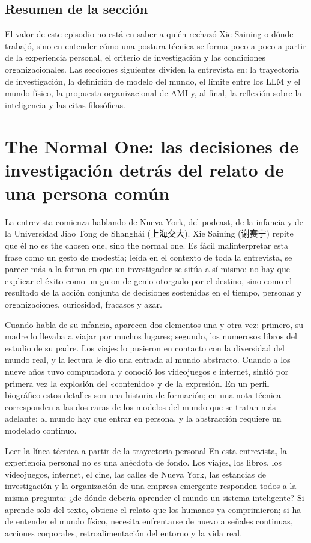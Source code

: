 \documentclass[a4paper]{article}
\begin{document}
\subsection{Resumen de la sección}

El valor de este episodio no está en saber a quién rechazó Xie Saining o dónde trabajó, sino en entender cómo una postura técnica se forma poco a poco a partir de la experiencia personal, el criterio de investigación y las condiciones organizacionales. Las secciones siguientes dividen la entrevista en: la trayectoria de investigación, la definición de modelo del mundo, el límite entre los LLM y el mundo físico, la propuesta organizacional de AMI y, al final, la reflexión sobre la inteligencia y las citas filosóficas.

\section{The Normal One: las decisiones de investigación detrás del relato de una persona común}

La entrevista comienza hablando de Nueva York, del podcast, de la infancia y de la Universidad Jiao Tong de Shanghái (上海交大). Xie Saining (谢赛宁) repite que él no es the chosen one, sino the normal one. Es fácil malinterpretar esta frase como un gesto de modestia; leída en el contexto de toda la entrevista, se parece más a la forma en que un investigador se sitúa a sí mismo: no hay que explicar el éxito como un guion de genio otorgado por el destino, sino como el resultado de la acción conjunta de decisiones sostenidas en el tiempo, personas y organizaciones, curiosidad, fracasos y azar.

Cuando habla de su infancia, aparecen dos elementos una y otra vez: primero, su madre lo llevaba a viajar por muchos lugares; segundo, los numerosos libros del estudio de su padre. Los viajes lo pusieron en contacto con la diversidad del mundo real, y la lectura le dio una entrada al mundo abstracto. Cuando a los nueve años tuvo computadora y conoció los videojuegos e internet, sintió por primera vez la explosión del «contenido» y de la expresión. En un perfil biográfico estos detalles son una historia de formación; en una nota técnica corresponden a las dos caras de los modelos del mundo que se tratan más adelante: al mundo hay que entrar en persona, y la abstracción requiere un modelado continuo.

\begin{knowledgebox}{Leer la línea técnica a partir de la trayectoria personal}
En esta entrevista, la experiencia personal no es una anécdota de fondo. Los viajes, los libros, los videojuegos, internet, el cine, las calles de Nueva York, las estancias de investigación y la organización de una empresa emergente responden todos a la misma pregunta: ¿de dónde debería aprender el mundo un sistema inteligente? Si aprende solo del texto, obtiene el relato que los humanos ya comprimieron; si ha de entender el mundo físico, necesita enfrentarse de nuevo a señales continuas, acciones corporales, retroalimentación del entorno y la vida real.
\end{knowledgebox}
\end{document}
